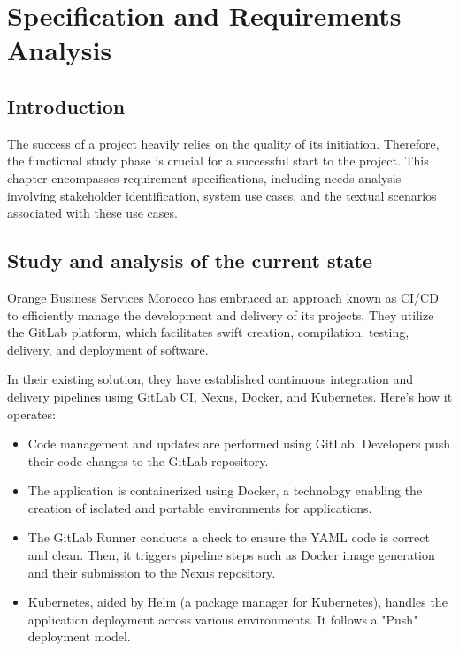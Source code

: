 \chapter{Specification and Requirements Analysis}
\label{chap:Chapter 2 title}
\section{Introduction}


The success of a project heavily relies on the quality of its initiation. Therefore, the functional study phase is crucial for a successful start to the project. This chapter encompasses requirement specifications, including needs analysis involving stakeholder identification, system use cases, and the textual scenarios associated with these use cases.

\pagebreak

\section{Study and analysis of the current state}

Orange Business Services Morocco has embraced an approach known as CI/CD to efficiently manage the development and delivery of its projects. They utilize the GitLab platform, which facilitates swift creation, compilation, testing, delivery, and deployment of software.

In their existing solution, they have established continuous integration and delivery pipelines using GitLab CI, Nexus, Docker, and Kubernetes. Here's how it operates:

\begin{itemize}
  \item Code management and updates are performed using GitLab. Developers push their code changes to the GitLab repository.
  \item The application is containerized using Docker, a technology enabling the creation of isolated and portable environments for applications.
  \item The GitLab Runner conducts a check to ensure the YAML code is correct and clean. Then, it triggers pipeline steps such as Docker image generation and their submission to the Nexus repository.
  \item Kubernetes, aided by Helm (a package manager for Kubernetes), handles the application deployment across various environments. It follows a "Push" deployment model.
\end{itemize}

